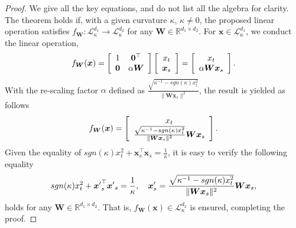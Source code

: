 \begin{proof}
We give all the key equations, and do not list all the algebra for clarity.
The theorem holds if, with a given curvature $\kappa$, $\kappa \neq 0$, the proposed linear operation satisfies $f_{\boldsymbol W}:\mathcal L_{\kappa }^{d_1}\to \mathcal L_{\kappa }^{d_2}$ for  any $\boldsymbol W \in \mathbb R^{{d_1}\times{d_2}}$.
For $\boldsymbol x \in \mathcal L_{\kappa }^{d_1}$, we conduct the linear operation,
\vspace{-0.03in}
\begin{equation}
f_{\boldsymbol W}(\boldsymbol x)=
\left[\begin{array}{cc}
1 & \mathbf{0}^{\top} \\
\mathbf{0} & \alpha \boldsymbol W
\end{array}\right]
\left[\begin{array}{c}
x_t \\
\boldsymbol x_s
\end{array}\right]
= \left[\begin{array}{c}
x_t \\
\alpha \boldsymbol W\boldsymbol x_s
\end{array}\right].
\vspace{-0.05in}
\end{equation}
With the re-scaling factor $\alpha$ defined as $\frac{\sqrt{\kappa^{-1}-sgn(\kappa)x^2_t}}{\|\boldsymbol W\boldsymbol x_s\|^2}$, the result is yielded as follows
\vspace{-0.1in}
\begin{equation}
f_{\boldsymbol W}(\boldsymbol x)
= \left[\begin{array}{c}
x_t \\
\frac{\sqrt{\kappa^{-1}-sgn(\kappa)x^2_t}}{\|\boldsymbol W\boldsymbol x_s\|^2} \boldsymbol W\boldsymbol x_s
\end{array}\right].
\vspace{-0.05in}
\end{equation}
Given the equality of $sgn(\kappa)x_t^2+{\boldsymbol x}_s^\top{\boldsymbol x}_s=\frac{1}{\kappa}$, it is easy to verify the following equality
\vspace{-0.1in}
\begin{equation}
sgn(\kappa)x_t^2+{\boldsymbol x'}_s^\top{\boldsymbol x'}_s=\frac{1}{\kappa},  \quad
\boldsymbol x'_s=
\frac{\sqrt{\kappa^{-1}-sgn(\kappa)x^2_t}}{\|\boldsymbol W\boldsymbol x_s\|^2} \boldsymbol W\boldsymbol x_s,
\vspace{-0.03in}
\end{equation}
holds for any $\boldsymbol W \in \mathbb R^{{d_1}\times{d_2}}$.
That is, $f_{\boldsymbol W}(\boldsymbol x) \in \mathcal L_{\kappa }^{d_2}$ is ensured, completing the proof.
\end{proof}

